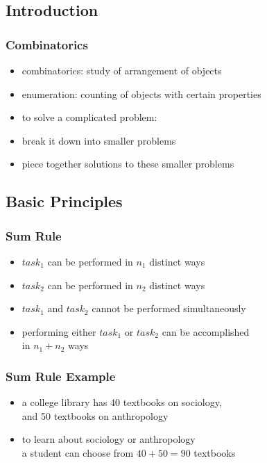 \documentclass[dvipsnames]{beamer}
\begin{document}
\subsection{Introduction}

\begin{frame}
  \frametitle{Combinatorics}

  \begin{itemize}
    \item \alert{combinatorics}: study of arrangement of objects
    \item \alert{enumeration}: counting of objects with certain properties

    \pause
    \bigskip
    \item to solve a complicated problem:
    \smallskip
    \item break it down into smaller problems
    \item piece together solutions to these smaller problems
  \end{itemize}
\end{frame}

\subsection{Basic Principles}

\begin{frame}
  \frametitle{Sum Rule}

  \begin{itemize}
    \item $task_1$ can be performed in $n_1$ distinct ways
    \item $task_2$ can be performed in $n_2$ distinct ways
    \item $task_1$ and $task_2$ cannot be performed simultaneously

    \pause
    \bigskip
    \item performing either $task_1$ or $task_2$ can be accomplished\\
      in $n_1 + n_2$ ways
  \end{itemize}
\end{frame}

\begin{frame}
  \frametitle{Sum Rule Example}

  \begin{itemize}
    \item a college library has 40 textbooks on sociology,\\
      and 50 textbooks on anthropology

    \medskip
    \item to learn about sociology or anthropology\\
      a student can choose from $40 + 50 = 90$ textbooks
  \end{itemize}
\end{frame}
\end{document}
